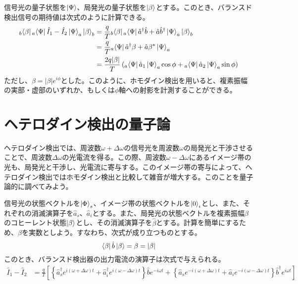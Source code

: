 信号光の量子状態を$\ket \Psi$、局発光の量子状態を$\ket \beta$とする。このとき、バランスド検出信号の期待値は次式のように計算できる。
\begin{equation}
\begin{aligned}
  {}_b\! \bra \beta {}_a\!\bra{\Psi}\hat I_1 - \hat I_2 \ket \Psi _ a \ket \beta _ b &= \frac{q}{T} {}_b\! \bra \beta {}_a\! \bra {\Psi} \hat a^\dagger \hat b + \hat a \hat b^\dagger \ket \Psi_a \ket \beta _ b\\
  &= \frac{q}{T}{}_a\!\bra \Psi \hat a^\dagger \beta + \hat a \beta^*\ket \Psi _ a\\
  &= \frac{2q|\beta|}{T}\left( 
  {}_a \!\bra \Psi \hat a_1 \ket \Psi_a \cos \phi + {}_a \! \bra \Psi \hat a_2 \ket \Psi_a \sin \phi
  \right)
  \end{aligned}
\end{equation}
ただし、$\beta = |\beta|e^{i\phi}$とした。このように、ホモダイン検出を用いると、複素振幅の実部・虚部のいずれか、もしくは$\phi$軸への射影を計測することができる。

\section{ヘテロダイン検出の量子論}
ヘテロダイン検出では、周波数$\omega + \Delta \omega$の信号光を周波数$\omega$の局発光と干渉させることで、周波数$\Delta \omega$の光電流を得る。この際、周波数$\omega - \Delta \omega$にあるイメージ帯の光も、局発光と干渉し、光電流に寄与する。このイメージ帯の寄与によって、ヘテロダイン検出ではホモダイン検出と比較して雑音が増大する。このことを量子論的に調べてみよう。

信号光の状態ベクトルを$\ket \Phi _ s$、イメージ帯の状態ベクトルを$\ket 0_i$とし、また、それぞれの消滅演算子を$\hat a_s$、$\hat a_i$とする。また、局発光の状態ベクトルを複素振幅$\beta$のコヒーレント状態$\ket \beta$とし、その消滅演算子を$\hat \beta$とする。計算を簡単にするため、$\beta$を実数としよう。すなわち、次式が成り立つものとする。
\begin{equation}
  \bra \beta \hat b \ket \beta = \beta = |\beta|
\end{equation}
このとき、バランスド検出器の出力電流の演算子は次式で与えられる。
\begin{equation}
  \begin{aligned}
  	\hat I_1 - \hat I_2 &= \frac{q}{T}\left[
  	\left\{\hat a_s^\dagger e^{i(\omega + \Delta \omega)t} + \hat a_i^\dagger e^{i(\omega - \Delta \omega)t}\right\}\hat b e^{-i\omega t} + 
  	\left\{
  		\hat a_s e^{-i(\omega + \Delta \omega)t} + \hat a_i e^{-i(\omega - \Delta \omega)t}
  	\right\}\hat b^\dagger e^{i\omega t}
  	\right]
  \end{aligned}
\end{equation}

